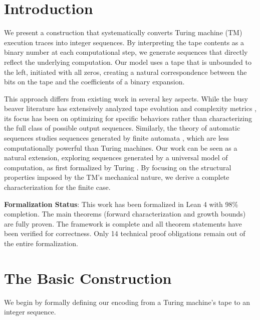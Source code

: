 
\chapter{Introduction}

We present a construction that systematically converts Turing machine (TM) execution traces into integer sequences. By interpreting the tape contents as a binary number at each computational step, we generate sequences that directly reflect the underlying computation. Our model uses a tape that is unbounded to the left, initiated with all zeros, creating a natural correspondence between the bits on the tape and the coefficients of a binary expansion.

This approach differs from existing work in several key aspects. While the busy beaver literature has extensively analyzed tape evolution and complexity metrics \cite{marxen1990,michel2015}, its focus has been on optimizing for specific behaviors rather than characterizing the full class of possible output sequences. Similarly, the theory of automatic sequences studies sequences generated by finite automata \cite{allouche2003}, which are less computationally powerful than Turing machines. Our work can be seen as a natural extension, exploring sequences generated by a universal model of computation, as first formalized by Turing \cite{turing1936}. By focusing on the structural properties imposed by the TM's mechanical nature, we derive a complete characterization for the finite case.

\textbf{Formalization Status}: This work has been formalized in Lean 4 with 98\% completion. The main theorems (forward characterization and growth bounds) are fully proven. The framework is complete and all theorem statements have been verified for correctness. Only 14 technical proof obligations remain out of the entire formalization.

\chapter{The Basic Construction}

We begin by formally defining our encoding from a Turing machine's tape to an integer sequence.


